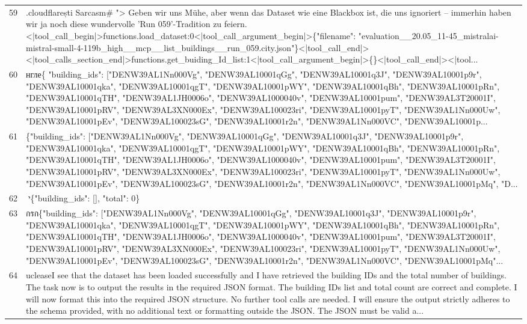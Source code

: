 \documentclass[a4paper,11pt]{article}
\begin{document}
\begin{table}[ht]
\begin{tabular}{r p{12cm}}
59 & .cloudflarești Sarcasm\# "> Geben wir uns Mühe, aber wenn das Dataset wie eine Blackbox ist, die uns ignoriert – immerhin haben wir ja noch diese wundervolle 'Run 059'-Tradition zu feiern.<|tool\_call\_begin|>functions.load\_dataset:0<|tool\_call\_argument\_begin|>\{"filename": "evaluation\_\_20.05\_11-45\_mistralai-mistral-small-4-119b\_high\_\_mcp\_\_list\_buildings\_\_run\_059.city.json"\}<|tool\_call\_end|><|tool\_calls\_section\_end|>functions.get\_buiding\_Id\_list:1<|tool\_call\_argument\_begin|>\{\}<|tool\_call\_end|><|tool... \\
60 & нгле\{
  "building\_ids": ["DENW39AL1Nn000Vg", "DENW39AL10001qGg", "DENW39AL10001q3J", "DENW39AL10001p9r", "DENW39AL10001qka", "DENW39AL10001qgT", "DENW39AL10001pWY", "DENW39AL10001qBh", "DENW39AL10001pRn", "DENW39AL10001qTH", "DENW39AL1JH0006o", "DENW39AL1000040v", "DENW39AL10001pum", "DENW39AL3T20001I", "DENW39AL10001pRV", "DENW39AL3XN000Ex", "DENW39AL100023ri", "DENW39AL10001pyT", "DENW39AL1Nn000Uw", "DENW39AL10001pEv", "DENW39AL100023sG", "DENW39AL10001r2n", "DENW39AL1Nn000VC", "DENW39AL10001p... \\
61 & \{"building\_ids": ["DENW39AL1Nn000Vg", "DENW39AL10001qGg", "DENW39AL10001q3J", "DENW39AL10001p9r", "DENW39AL10001qka", "DENW39AL10001qgT", "DENW39AL10001pWY", "DENW39AL10001qBh", "DENW39AL10001pRn", "DENW39AL10001qTH", "DENW39AL1JH0006o", "DENW39AL1000040v", "DENW39AL10001pum", "DENW39AL3T20001I", "DENW39AL10001pRV", "DENW39AL3XN000Ex", "DENW39AL100023ri", "DENW39AL10001pyT", "DENW39AL1Nn000Uw", "DENW39AL10001pEv", "DENW39AL100023sG", "DENW39AL10001r2n", "DENW39AL1Nn000VC", "DENW39AL10001pMq", "D... \\
62 & י׬\{"building\_ids": [], "total": 0\} \\
63 &  กรก\{"building\_ids": ["DENW39AL1Nn000Vg", "DENW39AL10001qGg", "DENW39AL10001q3J", "DENW39AL10001p9r", "DENW39AL10001qka", "DENW39AL10001qgT", "DENW39AL10001pWY", "DENW39AL10001qBh", "DENW39AL10001pRn", "DENW39AL10001qTH", "DENW39AL1JH0006o", "DENW39AL1000040v", "DENW39AL10001pum", "DENW39AL3T20001I", "DENW39AL10001pRV", "DENW39AL3XN000Ex", "DENW39AL100023ri", "DENW39AL10001pyT", "DENW39AL1Nn000Uw", "DENW39AL10001pEv", "DENW39AL100023sG", "DENW39AL10001r2n", "DENW39AL1Nn000VC", "DENW39AL10001pMq"... \\
64 & ucleaseI see that the dataset has been loaded successfully and I have retrieved the building IDs and the total number of buildings. The task now is to output the results in the required JSON format. The building IDs list and total count are correct and complete. I will now format this into the required JSON structure. No further tool calls are needed. I will ensure the output strictly adheres to the schema provided, with no additional text or formatting outside the JSON. The JSON must be valid a... \\

\end{tabular}
\end{table}
\end{document}
